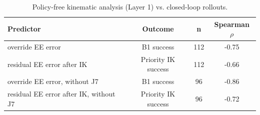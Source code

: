 \begin{table}[t]
\centering
\caption{Policy-free kinematic analysis (Layer 1) vs. closed-loop rollouts.}
\label{tab:layer1}
\setlength{\tabcolsep}{3pt}
\begin{tabular}{lccc}
\toprule
Predictor & Outcome & n & Spearman $\rho$ \\
\midrule
override EE error & B1 success & 112 & -0.75 \\
residual EE error after IK & Priority IK success & 112 & -0.66 \\
override EE error, without J7 & B1 success & 96 & -0.86 \\
residual EE error after IK, without J7 & Priority IK success & 96 & -0.72 \\
\bottomrule
\end{tabular}
\end{table}
